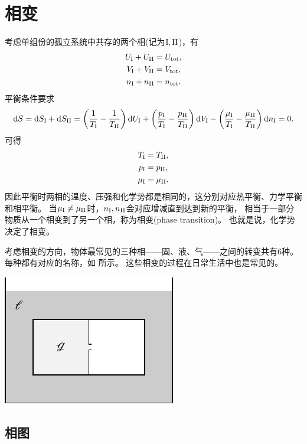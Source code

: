\section{相变}
\label{sec:phase transition}

考虑单组份的孤立系统中共存的两个相(记为$\mathrm{I},\mathrm{II}$)，有
\begin{align*}
	U_{\mathrm{I}}+U_{\mathrm{II}}&=U_\mathrm{tot},\\
	V_{\mathrm{I}}+V_{\mathrm{II}}&=V_\mathrm{tot},\\
	n_{\mathrm{I}}+n_{\mathrm{II}}&=n_\mathrm{tot}.
\end{align*}
平衡条件要求
\[
	\mathop{}\!\mathrm{d} S=\mathop{}\!\mathrm{d} S_{\mathrm{I}}+\mathop{}\!\mathrm{d} S_{\mathrm{II}}
	=\biggl(\frac1{T_{\mathrm{I}}}-\frac1{T_{\mathrm{II}}}\biggr)\mathop{}\!\mathrm{d} U_{\mathrm{I}}
	+\biggl(\frac{p_{\mathrm{I}}}{T_{\mathrm{I}}}-\frac{p_{\mathrm{II}}}{T_{\mathrm{II}}}\biggr)\mathop{}\!\mathrm{d} V_{\mathrm{I}}
	-\biggl(\frac{\mu_{\mathrm{I}}}{T_{\mathrm{I}}}-\frac{\mu_{\mathrm{II}}}{T_{\mathrm{II}}}\biggr)\mathop{}\!\mathrm{d} n_{\mathrm{I}}
	=0.
\]
可得
\begin{subequations}
	\begin{align}
		T_{\mathrm{I}}&=T_{\mathrm{II}},\\
		p_{\mathrm{I}}&=p_{\mathrm{II}},\\
		\mu_{\mathrm{I}}&=\mu_{\mathrm{II}}.
	\end{align}
\end{subequations}
因此平衡时两相的温度、压强和化学势都是相同的，这分别对应热平衡、力学平衡和相平衡。
当$\mu_{\mathrm{I}}\neq\mu_{\mathrm{II}}$时，$n_{\mathrm{I}},n_{\mathrm{II}}$会对应增减直到达到新的平衡，
相当于一部分物质从一个相变到了另一个相，称为相变(phase transition)。
也就是说，化学势决定了相变。

考虑相变的方向，物体最常见的三种相——固、液、气——之间的转变共有6种。每种都有对应的名称，如 所示。
这些相变的过程在日常生活中也是常见的。

\begin{center}
	\includegraphics[page=6]{figures/tikz/layouts.pdf}
	\label{fig:phase transition}
\end{center}

\subsection{相图}
\label{ssec:phase graph}

